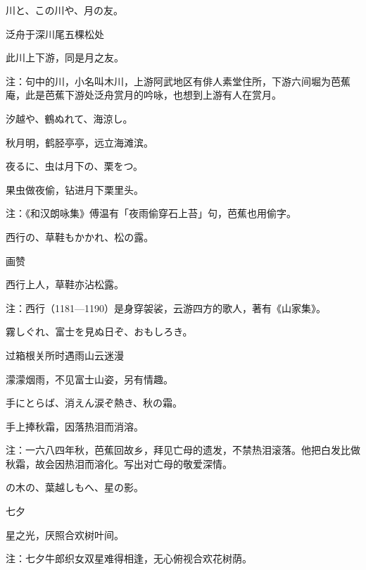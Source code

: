\begin{haiku}
    {\FH 川と、この川や、月の友。}

    {\FK 泛舟于深川尾五棵松处}

    {\FK 此川上下游，同是月之友。}

    {\FT 注：句中的川，小名叫木川，上游阿武地区有俳人素堂住所，下游六间堀为芭蕉庵，此是芭蕉下游处泛舟赏月的吟咏，也想到上游有人在赏月。}
\end{haiku}

\begin{haiku}
    {\FH 汐越や、鶴ぬれて、海涼し。}

    {\FK 秋月明，鹤胫亭亭，远立海滩滨。}
\end{haiku}

\begin{haiku}
    {\FH 夜るに、虫は月下の、栗をつ。}

    {\FK 果虫做夜偷，钻进月下栗里头。}

    {\FT 注：《和汉朗咏集》傅温有「夜雨偷穿石上苔」句，芭蕉也用偷字。}
\end{haiku}

\begin{haiku}
    {\FH 西行の、草鞋もかかれ、松の露。}

    {\FK 画赞}

    {\FK 西行上人，草鞋亦沾松露。}

    {\FT 注：西行（1181—1190）是身穿袈裟，云游四方的歌人，著有《山家集》。}
\end{haiku}

\begin{haiku}
    {\FH 霧しぐれ、富士を見ぬ日ぞ、おもしろき。}

    {\FK 过箱根关所时遇雨山云迷漫}

    {\FK 濛濛烟雨，不见富士山姿，另有情趣。}
\end{haiku}

\begin{haiku}
    {\FH 手にとらば、消えん涙ぞ熱き、秋の霜。}

    {\FK 手上捧秋霜，因落热泪而消溶。}

    {\FT 注：一六八四年秋，芭蕉回故乡，拜见亡母的遗发，不禁热泪滚落。他把白发比做秋霜，故会因热泪而溶化。写出对亡母的敬爱深情。}
\end{haiku}

\begin{haiku}
    {\FH {}の木の、葉越しもへ、星の影。}

    {\FK 七夕}

    {\FK 星之光，厌照合欢树叶间。}

    {\FT 注：七夕牛郎织女双星难得相逢，无心俯视合欢花树荫。}
\end{haiku}

